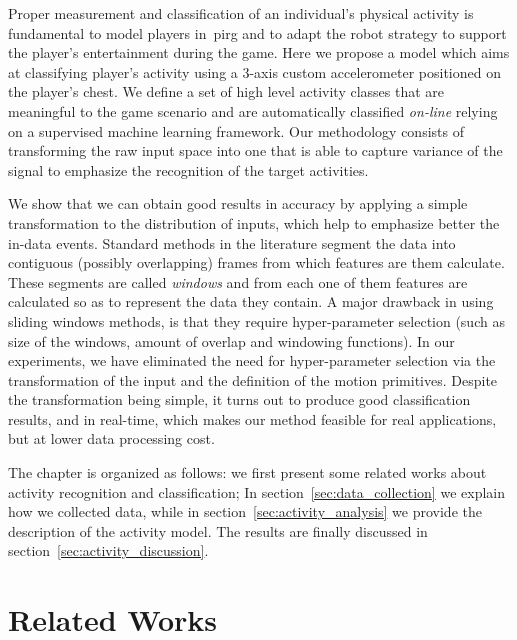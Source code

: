 Proper measurement and classification of an individual's physical  activity is fundamental to model players in~\gls{pirg} and to adapt the robot strategy to support the player's entertainment during the game. Here we propose a model which aims at classifying player's activity using a 3-axis custom accelerometer positioned on the player's chest. We define a set of high level activity classes that are meaningful to the game scenario and are automatically classified \textit{on-line} relying on a supervised machine learning framework. Our methodology consists of transforming the raw input space into one that is able to capture variance of the signal to emphasize the recognition of the target activities. 

We show that we can obtain good results in accuracy by applying a simple transformation to the distribution of inputs, which help to emphasize better the in-data events. Standard methods in the literature segment the data into contiguous (possibly overlapping) frames from which features are them calculate. These segments are called \textit{windows} and from each one of them features are calculated so as to represent the data they contain. A major drawback in using sliding windows methods, is that they require hyper-parameter selection (such as size of the windows, amount of overlap and windowing functions). In our experiments, we have eliminated the need for hyper-parameter selection via the transformation of the input and the definition of the motion primitives. Despite the transformation being simple, it turns out to produce good classification results, and in real-time, which makes our method feasible for real applications, but at lower data processing cost.

The chapter is organized as follows: we first present some related works about activity recognition and classification; In section~\ref{sec:data_collection} we explain how we collected data, while in section~\ref{sec:activity_analysis} we provide the description of the activity model. The results are finally discussed in section~\ref{sec:activity_discussion}.

\section{Related Works}\label{sec:act_related_works} %

